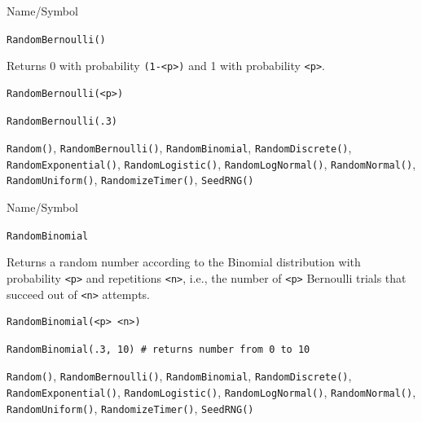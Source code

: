 \begin{desc}{Name/Symbol}
\item[Name/Symbol]	\verb+RandomBernoulli()+

\item[Description]	Returns 0 with probability \verb+(1-<p>)+ and 1 with probability \verb+<p>+.

\item[Usage]		
\begin{verbatim}
RandomBernoulli(<p>)
\end{verbatim}

\item[Example]	
\begin{verbatim}
RandomBernoulli(.3)
\end{verbatim}

\item[See Also] \verb+Random()+, \verb+RandomBernoulli()+,
  \verb+RandomBinomial+, \verb+RandomDiscrete()+,
  \verb+RandomExponential()+, \verb+RandomLogistic()+,
  \verb+RandomLogNormal()+, \verb+RandomNormal()+,
  \verb+RandomUniform()+, \verb+RandomizeTimer()+, \verb+SeedRNG()+
\end{desc}

\begin{desc}{Name/Symbol}
\item[Name/Symbol]	\verb+RandomBinomial+

\item[Description] Returns a random number according to the Binomial
  distribution with probability \verb+<p>+ and repetitions \verb+<n>+,
  i.e., the number of \verb+<p>+ Bernoulli trials that succeed out of
  \verb+<n>+ attempts.

\item[Usage]		
\begin{verbatim}
RandomBinomial(<p> <n>)  
\end{verbatim}

\item[Example]	
\begin{verbatim}
RandomBinomial(.3, 10) # returns number from 0 to 10
\end{verbatim}

\item[See Also]	\verb+Random()+, \verb+RandomBernoulli()+, \verb+RandomBinomial+,
		\verb+RandomDiscrete()+, \verb+RandomExponential()+, \verb+RandomLogistic()+,
		\verb+RandomLogNormal()+, \verb+RandomNormal()+, \verb+RandomUniform()+,    
		\verb+RandomizeTimer()+, \verb+SeedRNG()+    
\end{desc}

